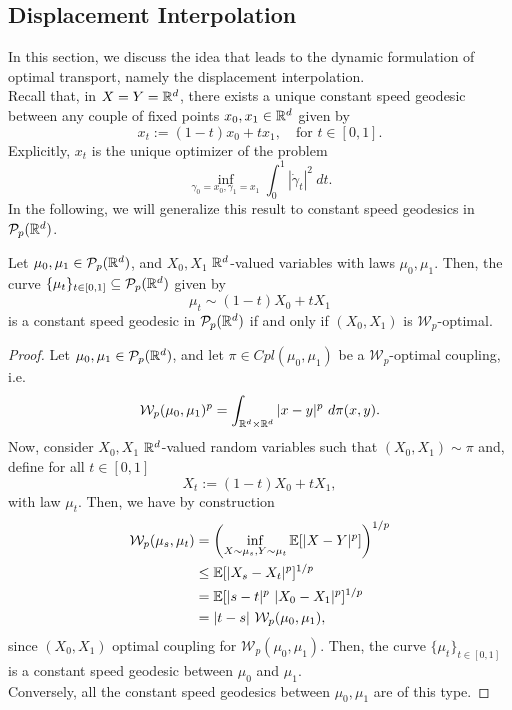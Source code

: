 \documentclass[../main.tex]{subfiles}
\begin{document}
\subsection{Displacement Interpolation}
In this section, we discuss the idea that leads to the dynamic formulation of optimal transport, namely the displacement interpolation. \\
Recall that, in $X=Y=\mathbb{R}^d$, there exists a unique constant speed geodesic between any couple of fixed points $x_0, x_1\in\mathbb{R}^d$ given by
$$
x_t := (1-t)x_0 + tx_1, \quad \text{for } t\in[0,1].
$$
Explicitly, $x_t$ is the unique optimizer of the problem
$$
\inf_{\gamma_0=x_0, \gamma_1=x_1}\int_0^1 |\dot \gamma_t|^2 \ dt.
$$
In the following, we will generalize this result to constant speed geodesics in $\mathcal{P}_p(\mathbb{R}^d)$.

\begin{proposition}
    Let $\mu_0, \mu_1\in\mathcal{P}_p(\mathbb{R}^d)$, and $X_0, X_1$ $\mathbb{R}^d$-valued variables with laws $\mu_0, \mu_1$. Then, the curve $\{\mu_t\}_{t\in[0,1]}\subseteq \mathcal{P}_p(\mathbb{R}^d)$ given by $$\mu_t \sim (1-t)X_0 + tX_1$$ is a constant speed geodesic in $\mathcal{P}_p(\mathbb{R}^d)$ if and only if $(X_0, X_1)$ is $\mathcal{W}_p$-optimal.
\end{proposition}
\begin{proof}
    Let $\mu_0, \mu_1\in\mathcal{P}_p(\mathbb{R}^d)$, and let $\pi\in Cpl(\mu_0, \mu_1)$ be a $\mathcal{W}_p$-optimal coupling, i.e. 
    $$
    \mathcal{W}_p(\mu_0, \mu_1)^p =  \int_{\mathbb{R}^d\times\mathbb{R}^d} |x-y|^p \ d\pi(x, y).
    $$
    Now, consider $X_0, X_1$ $\mathbb{R}^d$-valued random variables such that $(X_0, X_1)\sim \pi$ and, define for all $t\in[0,1]$
    $$
    X_t := (1-t)X_0 + tX_1,
    $$
    with law $\mu_t$. Then, we have by construction 
    \begin{align*}
        \mathcal{W}_p(\mu_s, \mu_t) 
        &= \left(\inf_{X\sim\mu_s, Y\sim\mu_t} \mathbb{E}[|X-Y|^p]\right)^{1/p} \\
        &\leq \mathbb{E}[|X_s - X_t|^p]^{1/p} \\
        &= \mathbb{E}[|s-t|^p \ |X_0 - X_1|^p]^{1/p} \\
        &= |t-s| \ \mathcal{W}_p(\mu_0, \mu_1),
    \end{align*}
    since $(X_0, X_1)$ optimal coupling for $\mathcal{W}_p(\mu_0, \mu_1)$. Then, the curve $\{\mu_t\}_{t\in[0,1]}$ is a constant speed geodesic between $\mu_0$ and $\mu_1$. \\
    Conversely, all the constant speed geodesics between $\mu_0, \mu_1$ are of this type.
\end{proof}
\end{document}
